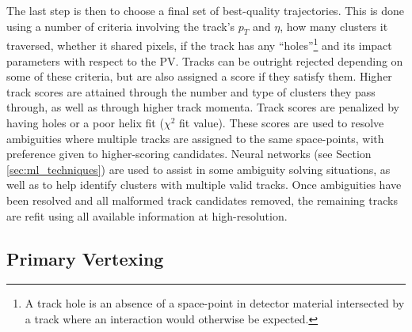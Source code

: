             The last step is then to choose a final set of best-quality trajectories.
            This is done using a number of criteria involving
                the track's $p_T$ and $\eta$,
                how many clusters it traversed, 
                whether it shared pixels,
                if the track has any ``holes''\footnote{
                    A track hole is an absence of a space-point in detector material intersected by a track
                    where an interaction would otherwise be expected.
                } and its impact parameters with respect to the PV\cite{atlas_track_reco_performance}.
            Tracks can be outright rejected depending on some of these criteria,
                but are also assigned a score if they satisfy them.
            Higher track scores are attained through the number and type of clusters they pass through,
                as well as through higher track momenta.
            Track scores are penalized by having holes or a poor helix fit ($\chi^2$ fit value).
            These scores are used to resolve ambiguities where multiple tracks are assigned to the same space-points,
                with preference given to higher-scoring candidates.
            Neural networks (see Section \ref{sec:ml_techniques})
                are used to assist in some ambiguity solving situations,
                as well as to help identify clusters with multiple valid tracks.
            Once ambiguities have been resolved and all malformed track candidates removed,
                the remaining tracks are refit using all available information at high-resolution\cite{atlas_track_reco_performance}.

        \FloatBarrier
        \subsection{Primary Vertexing}

